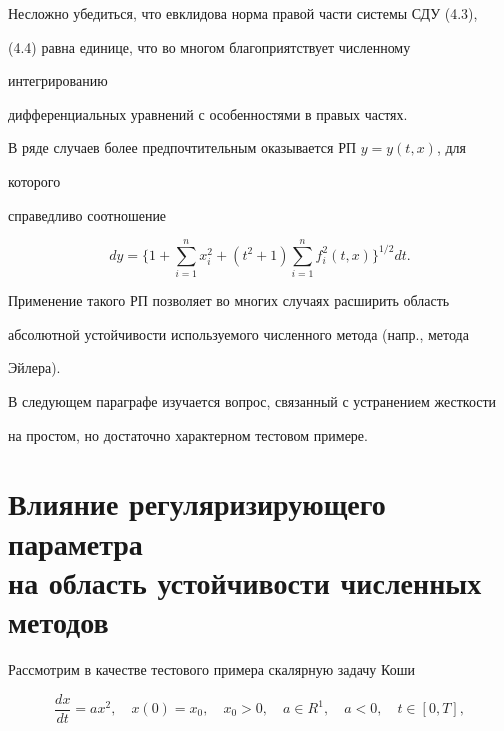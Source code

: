  


Несложно убедиться, что евклидова норма правой части системы СДУ (4.3), 


(4.4) равна единице, что во многом благоприятствует численному 


интегрированию 


дифференциальных уравнений с особенностями в правых частях. 


 


В ряде случаев более предпочтительным оказывается РП $y=y(t,x)$, для 


которого 


справедливо соотношение 


$$ 


dy=\bigg\{1+\sum^n_{i=1}x^2_i+(t^2+1)\sum^n_{i=1} 


f^2_i(t,x)\bigg\}^{1/2}dt. 


$$ 


Применение такого РП позволяет во многих случаях расширить область 


абсолютной устойчивости используемого численного метода (напр., метода 


Эйлера). 


 


В следующем параграфе изучается вопрос, связанный с устранением жесткости 


на простом, но достаточно характерном тестовом примере. 


 


\section{Влияние регуляризирующего параметра\protect\\


на область устойчивости численных методов} 


 


Рассмотрим в качестве тестового примера скалярную задачу Коши 


\begin{equation} 


\frac{dx}{dt}=ax^2,\quad x(0)=x_0,\quad x_0>0,\quad 


a\in R^1,\quad a<0,\quad t\in[0,T], 


\end{equation} 


